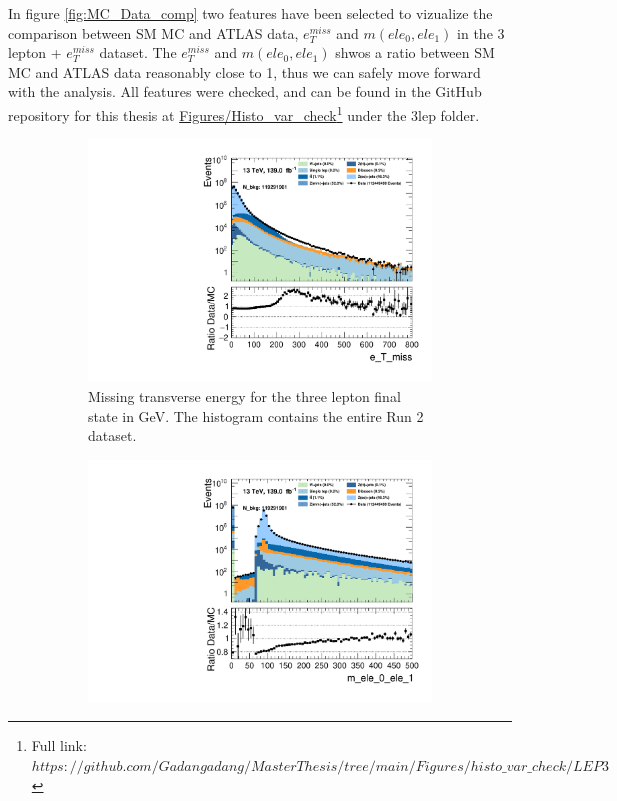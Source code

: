 In figure \ref{fig:MC_Data_comp} two features have been selected to vizualize the comparison between SM MC and ATLAS data, $e_T^{miss}$ 
and $m(ele_0, ele_1)$ in the 3 lepton + $e_T^{miss}$ dataset. The $e_T^{miss}$ and $m(ele_0, ele_1)$ shwos a ratio between SM MC and ATLAS data reasonably close to 1, thus we can safely 
move forward with the analysis. All features were checked, and can be found in the GitHub repository for this thesis at 
\href{https://github.com/Gadangadang/MasterThesis/tree/main}{Figures/Histo\_var\_check}\footnote{Full link: \href{https://github.com/Gadangadang/MasterThesis/tree/main/Figures/histo_var_check/LEP3}{$https://github.com/Gadangadang/MasterThesis/tree/main/Figures/histo\_var\_check/LEP3$}} under the 3lep folder. \par 

\begin{figure}[H]
    \centering
    \begin{subfigure}{.6\textwidth}
        \includegraphics[width=\textwidth]{Figures/MC_Data_comp/lep2/e_T_miss_2lep.pdf}
        \caption{Missing transverse energy for the three lepton final state in GeV. The histogram contains the entire Run 2 dataset.}
        \label{fig:etmiss_2lep}
    \end{subfigure}
    \hfill
    \begin{subfigure}{.6\textwidth}
        \includegraphics[width=\textwidth]{Figures/MC_Data_comp/lep2/m_ele_0_ele_1_2lep.pdf}

\end{subfigure}
\end{figure}
